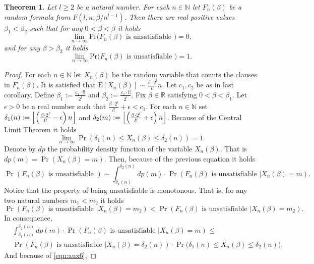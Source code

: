 \documentclass[12pt,notitlepage,a4paper]{article}
\newtheorem{theorem}{Theorem}[section]
\theoremstyle{definition}
\newcommand{\R}{\mathbb{R}}
\newcommand{\N}{\mathbb{N}}
\newcommand{\Ln}{\lim\limits_{n\to \infty}}
\newcommand{\PR}[1]{\mathrm{Pr}\big(#1\big)}
\DeclarePairedDelimiter\floor{\lfloor}{\rfloor}
\begin{document}
\begin{theorem} \label{thm:phasetransition}
	Let $l\geq 2$ be a natural number.
	For each $n\in \N$ let $F_n(\beta)$ be a random formula from
	$F(l,n,\beta/n^{l-1})$. Then there are real positive values 
	$\beta_1 < \beta_2$ such that for any $0<\beta<\beta$
	it holds
	\[
	\Ln \PR{F_n(\beta) \text{ is unsatisfiable }  }=0,
	\]
	and for any $\beta>\beta_2$
	it holds
	\[
	\Ln \PR{F_n(\beta) \text{ is unsatisfiable }  }=1.
	\]
\end{theorem}
\begin{proof}
	For each $n\in \N$ let $X_{n}(\beta)$ be the random variable
	that counts the clauses in $F_n(\beta)$. It is satisfied that
	$\mathrm{E}[X_n(\beta)]\sim \frac{\beta\cdot 2^l}{l!}n$. Let $c_1,
	c_2$ be as in last corollary. Define $\beta_1:= \frac{c_1\cdot l!}{2^l}$
	and $\beta_2:= \frac{c_2 \cdot l!}{2^l}$. Fix $\beta\in \R$ satisfying
	$0<\beta<\beta_1$. Let $\epsilon>0$ be a real number such that
	$ \frac{\beta\cdot 2^l}{l!} +\epsilon< c_1$. For each $n\in \N$
	set $\delta_1(n):=\floor*{ \left(\frac{\beta\cdot 2^l}{l!}-\epsilon\right)n}$
	and $\delta_2(m):=\floor*{ \left(\frac{\beta\cdot 2^l}{l!}+\epsilon\right)n}$.
	Because of the Central Limit
	Theorem it holds
	\begin{equation}\label{eqn:aux6}
	\Ln \Pr\left( \delta_1(n) \leq X_n(\beta)  
	\leq \delta_2(n)    \right) = 1.
	\end{equation}
	Denote by $dp$ the probability density function of the variable $X_n(\beta)$.
	That is $dp(m)=\Pr(X_n(\beta)=m)$. Then, because of the previous equation it holds
	\[
	\Pr\left( F_n(\beta) \text{ is unsatisfiable }\right)\sim
	\int_{\delta_1(n)}^{\delta_2(n)}
	dp(m) \cdot \Pr \left(
	F_n(\beta) \text{ is unsatisfiable } \Big|
	X_n(\beta)=m	
	\right).
	\]
	Notice that the property of being unsatisfiable is monotonous. That is,
	for any two natural numbers $m_1<m_2$ it holds
	\[
	 \Pr \left(
	F_n(\beta) \text{ is unsatisfiable } \Big|
	X_n(\beta)=m_2	
	\right) <  \Pr \left(
	F_n(\beta) \text{ is unsatisfiable } \Big|
	X_n(\beta)=m_2	
	\right).
	\]
	In consequence,
	\begin{align*}
	&\int_{\delta_1(n)}^{\delta_2(n)}
	dp(m) \cdot \Pr \left(
	F_n(\beta) \text{ is unsatisfiable } \Big|
	X_n(\beta)=m	
	\right)\leq \\ & 
	\Pr \left(
	F_n(\beta) \text{ is unsatisfiable } \Big|
	X_n(\beta)=\delta_2(n) \right) \cdot 
	\Pr\big( \delta_1(n) \leq X_n(\beta)  
	\leq \delta_2(n)  \big).   
	\end{align*}
	And because of \cref{eqn:aux6}, 

\end{proof}
\end{document}
